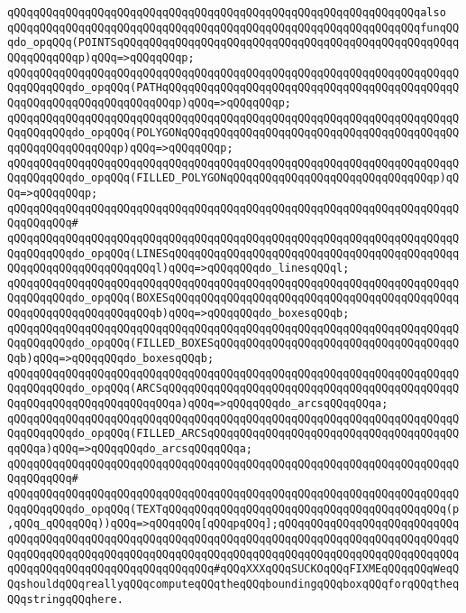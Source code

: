 \verb|qQQqqQQqqQQqqQQqqQQqqQQqqQQqqQQqqQQqqQQqqQQqqQQqqQQqqQQqqQQqqQQqalso|\newline
\verb|qQQqqQQqqQQqqQQqqQQqqQQqqQQqqQQqqQQqqQQqqQQqqQQqqQQqqQQqqQQqqQQqfunqQQqdo_opqQQq(POINTSqQQqqQQqqQQqqQQqqQQqqQQqqQQqqQQqqQQqqQQqqQQqqQQqqQQqqQQqqQQqqQQqp)qQQq=>qQQqqQQqp;|\newline
\verb|qQQqqQQqqQQqqQQqqQQqqQQqqQQqqQQqqQQqqQQqqQQqqQQqqQQqqQQqqQQqqQQqqQQqqQQqqQQqqQQqdo_opqQQq(PATHqQQqqQQqqQQqqQQqqQQqqQQqqQQqqQQqqQQqqQQqqQQqqQQqqQQqqQQqqQQqqQQqqQQqqQQqp)qQQq=>qQQqqQQqp;|\newline
\verb|qQQqqQQqqQQqqQQqqQQqqQQqqQQqqQQqqQQqqQQqqQQqqQQqqQQqqQQqqQQqqQQqqQQqqQQqqQQqqQQqdo_opqQQq(POLYGONqQQqqQQqqQQqqQQqqQQqqQQqqQQqqQQqqQQqqQQqqQQqqQQqqQQqqQQqqQQqp)qQQq=>qQQqqQQqp;|\newline
\verb|qQQqqQQqqQQqqQQqqQQqqQQqqQQqqQQqqQQqqQQqqQQqqQQqqQQqqQQqqQQqqQQqqQQqqQQqqQQqqQQqdo_opqQQq(FILLED_POLYGONqQQqqQQqqQQqqQQqqQQqqQQqqQQqqQQqp)qQQq=>qQQqqQQqp;|\newline
\verb|qQQqqQQqqQQqqQQqqQQqqQQqqQQqqQQqqQQqqQQqqQQqqQQqqQQqqQQqqQQqqQQqqQQqqQQqqQQqqQQq#|\newline
\verb|qQQqqQQqqQQqqQQqqQQqqQQqqQQqqQQqqQQqqQQqqQQqqQQqqQQqqQQqqQQqqQQqqQQqqQQqqQQqqQQqdo_opqQQq(LINESqQQqqQQqqQQqqQQqqQQqqQQqqQQqqQQqqQQqqQQqqQQqqQQqqQQqqQQqqQQqqQQqqQQql)qQQq=>qQQqqQQqdo_linesqQQql;|\newline
\verb|qQQqqQQqqQQqqQQqqQQqqQQqqQQqqQQqqQQqqQQqqQQqqQQqqQQqqQQqqQQqqQQqqQQqqQQqqQQqqQQqdo_opqQQq(BOXESqQQqqQQqqQQqqQQqqQQqqQQqqQQqqQQqqQQqqQQqqQQqqQQqqQQqqQQqqQQqqQQqqQQqb)qQQq=>qQQqqQQqdo_boxesqQQqb;|\newline
\verb|qQQqqQQqqQQqqQQqqQQqqQQqqQQqqQQqqQQqqQQqqQQqqQQqqQQqqQQqqQQqqQQqqQQqqQQqqQQqqQQqdo_opqQQq(FILLED_BOXESqQQqqQQqqQQqqQQqqQQqqQQqqQQqqQQqqQQqqQQqb)qQQq=>qQQqqQQqdo_boxesqQQqb;|\newline
\verb|qQQqqQQqqQQqqQQqqQQqqQQqqQQqqQQqqQQqqQQqqQQqqQQqqQQqqQQqqQQqqQQqqQQqqQQqqQQqqQQqdo_opqQQq(ARCSqQQqqQQqqQQqqQQqqQQqqQQqqQQqqQQqqQQqqQQqqQQqqQQqqQQqqQQqqQQqqQQqqQQqqQQqa)qQQq=>qQQqqQQqdo_arcsqQQqqQQqa;|\newline
\verb|qQQqqQQqqQQqqQQqqQQqqQQqqQQqqQQqqQQqqQQqqQQqqQQqqQQqqQQqqQQqqQQqqQQqqQQqqQQqqQQqdo_opqQQq(FILLED_ARCSqQQqqQQqqQQqqQQqqQQqqQQqqQQqqQQqqQQqqQQqqQQqa)qQQq=>qQQqqQQqdo_arcsqQQqqQQqa;|\newline
\verb|qQQqqQQqqQQqqQQqqQQqqQQqqQQqqQQqqQQqqQQqqQQqqQQqqQQqqQQqqQQqqQQqqQQqqQQqqQQqqQQq#|\newline
\verb|qQQqqQQqqQQqqQQqqQQqqQQqqQQqqQQqqQQqqQQqqQQqqQQqqQQqqQQqqQQqqQQqqQQqqQQqqQQqqQQqdo_opqQQq(TEXTqQQqqQQqqQQqqQQqqQQqqQQqqQQqqQQqqQQqqQQqqQQq(p,qQQq_qQQqqQQq))qQQq=>qQQqqQQq[qQQqpqQQq];qQQqqQQqqQQqqQQqqQQqqQQqqQQqqQQqqQQqqQQqqQQqqQQqqQQqqQQqqQQqqQQqqQQqqQQqqQQqqQQqqQQqqQQqqQQqqQQqqQQqqQQqqQQqqQQqqQQqqQQqqQQqqQQqqQQqqQQqqQQqqQQqqQQqqQQqqQQqqQQqqQQqqQQqqQQqqQQqqQQqqQQqqQQqqQQqqQQqqQQq#qQQqXXXqQQqSUCKOqQQqFIXMEqQQqqQQqWeqQQqshouldqQQqreallyqQQqcomputeqQQqtheqQQqboundingqQQqboxqQQqforqQQqtheqQQqstringqQQqhere.|\newline
